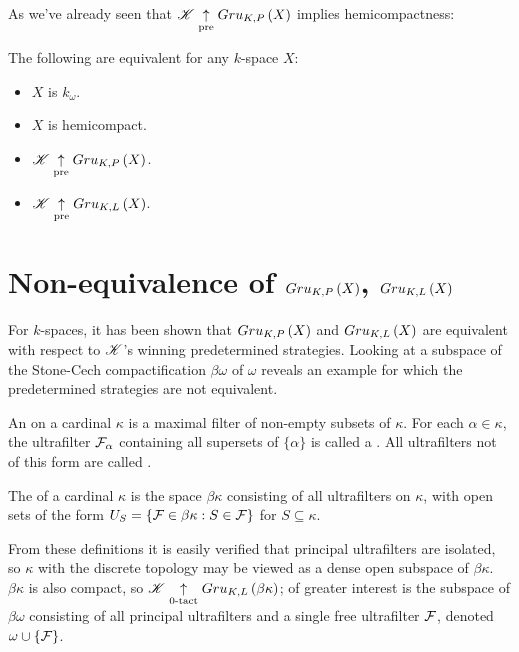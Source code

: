 As we've already seen that $\mathscr{K} \underset{\text{pre}}{\uparrow} Gru_{K,P}\left({X}\right)$ implies
hemicompactness:

\begin{cor}
  The following are equivalent for any $k$-space $X$:
    \begin{itemize}
      \item $X$ is $k_{\omega}$.
      \item $X$ is hemicompact.
      \item $\mathscr{K} \underset{\text{pre}}{\uparrow} Gru_{K,P}\left({X}\right)$.
      \item $\mathscr{K} \underset{\text{pre}}{\uparrow} Gru_{K,L}\left({X}\right)$.
    \end{itemize}
\end{cor}

\section{Non-equivalence of $Gru_{K,P}\left({X}\right)$, $Gru_{K,L}\left({X}\right)$}

For $k$-spaces, it has been shown that $Gru_{K,P}\left({X}\right)$ and $Gru_{K,L}\left({X}\right)$
are equivalent with respect to $\mathscr{K}$'s winning predetermined strategies.
Looking at a subspace of the Stone-Cech compactification $\beta\omega$ of
$\omega$ reveals an example for which the predetermined strategies are not
equivalent.

\begin{defn}
  An  on a cardinal $\kappa$ is a maximal filter of non-empty
  subsets of $\kappa$. For each $\alpha\in \kappa$, the ultrafilter
  $\mathcal{F}_\alpha$ containing all supersets of $\{\alpha\}$ is called a
  . All
  ultrafilters not of this form are called .
\end{defn}

\begin{defn}
  The  of a cardinal
  $\kappa$ is the space $\beta\kappa$ consisting
  of all ultrafilters on $\kappa$, with open sets of the form
  $U_S=\{\mathcal{F}\in\beta\kappa : S\in\mathcal{F}\}$ for $S\subseteq \kappa$.
\end{defn}

From these definitions it is easily verified that principal ultrafilters
are isolated, so $\kappa$ with the discrete topology may be viewed as
a dense open subspace of $\beta\kappa$. $\beta\kappa$ is also compact, so
$\mathscr{K}\underset{0\text{-tact}}{\uparrow}Gru_{K,L}\left({\beta\kappa}\right)$; of greater interest is the subspace
of $\beta\omega$ consisting of all principal ultrafilters and a single free
ultrafilter $\mathcal{F}$, denoted $\omega\cup\{\mathcal{F}\}$.

